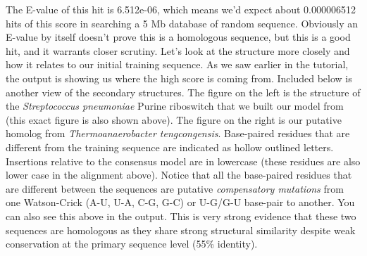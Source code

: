 The E-value of this hit is 6.512e-06, which means we'd expect about
0.000006512 hits of this score in searching a 5 Mb database of random
sequence. Obviously an E-value by itself doesn't prove this is a
homologous sequence, but this is a good hit, and it warrants closer
scrutiny. 
Let's look at the structure more closely and how it relates to our
initial training sequence.  As we saw earlier in the tutorial, the
 output is showing us where the high score is coming
from. Included below is another view of the secondary structures.  The
figure on the left is the structure of the \emph{Streptococcus
pneumoniae} Purine riboswitch that we built our model from (this exact
figure is also shown above).  The figure on the right is our putative
homolog from \emph{Thermoanaerobacter tengcongensis}.  Base-paired
residues that are different from the training sequence are indicated
as hollow outlined letters. Insertions relative to the consensus model
are in lowercase (these residues are also lower case in
the  alignment above). Notice that all the base-paired
residues that are different between the sequences are putative
\emph{compensatory mutations} from one Watson-Crick (A-U, U-A, C-G,
G-C) or U-G/G-U base-pair to another. You can also see this above in
the  output. This is very strong evidence that these
two sequences are homologous as they share strong structural
similarity despite weak conservation at the primary sequence level
(55\% identity).

